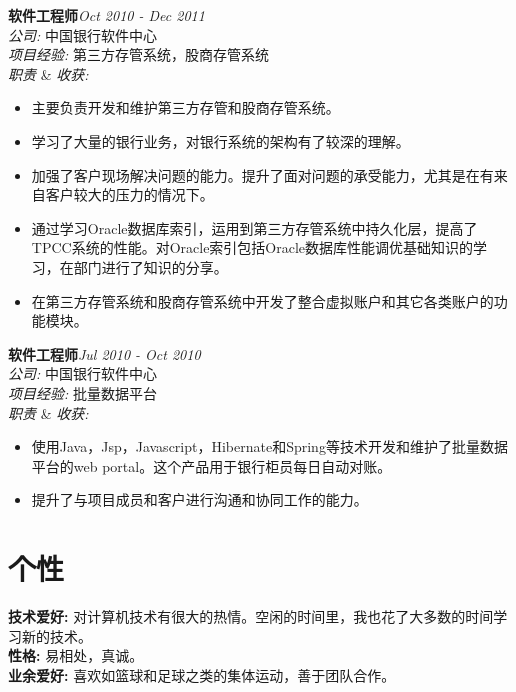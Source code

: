 \documentclass[line, margin, 12pt]{res}
\begin{document}
\begin{resume}
\pagebreak
{\bf 软件工程师}\hfill {\it Oct 2010 - Dec 2011}\\
{\sl 公司:} 中国银行软件中心\\
{\sl 项目经验:} 第三方存管系统，股商存管系统\\
{\sl 职责} \& {\sl 收获:}
\begin{itemize}
\item 主要负责开发和维护第三方存管和股商存管系统。
\item 学习了大量的银行业务，对银行系统的架构有了较深的理解。
\item 加强了客户现场解决问题的能力。提升了面对问题的承受能力，尤其是在有来自客户较大的压力的情况下。
\item 通过学习Oracle数据库索引，运用到第三方存管系统中持久化层，提高了TPCC系统的性能。对Oracle索引包括Oracle数据库性能调优基础知识的学习，在部门进行了知识的分享。
\item 在第三方存管系统和股商存管系统中开发了整合虚拟账户和其它各类账户的功能模块。
\end{itemize}

{\bf 软件工程师}\hfill {\it Jul 2010 - Oct 2010}\\
{\sl 公司:} 中国银行软件中心\\
{\sl 项目经验:} 批量数据平台\\
{\sl 职责} \& {\sl 收获:}
\begin{itemize}
\item 使用Java，Jsp，Javascript，Hibernate和Spring等技术开发和维护了批量数据平台的web portal。这个产品用于银行柜员每日自动对账。
\item 提升了与项目成员和客户进行沟通和协同工作的能力。
\end{itemize}

\section{个性}
{\bf 技术爱好:} 对计算机技术有很大的热情。空闲的时间里，我也花了大多数的时间学习新的技术。\\
{\bf 性格:} 易相处，真诚。\\
{\bf 业余爱好:} 喜欢如篮球和足球之类的集体运动，善于团队合作。\\
\end{resume}
\end{document}
